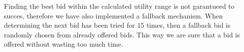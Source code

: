 Finding the best bid within the calculated utility range is not garantueed to succes, therefore we have also implemented a fallback mechanism. When determining the next bid has been tried for $15$ times, then a fallback bid is randomly chosen from already offered bids. This way we are sure that a bid is offered without wasting too much time.

